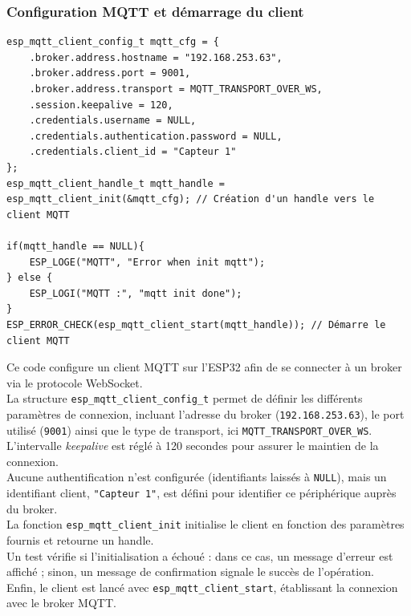 \documentclass[a4paper,11pt]{article}
\begin{document}
      \subsubsection{Configuration MQTT et démarrage du client}
      \begin{lstlisting}[style=C, caption={Event Handler de la pile IP Netif}]
esp_mqtt_client_config_t mqtt_cfg = { 
    .broker.address.hostname = "192.168.253.63",
    .broker.address.port = 9001,
    .broker.address.transport = MQTT_TRANSPORT_OVER_WS,
    .session.keepalive = 120, 
    .credentials.username = NULL,
    .credentials.authentication.password = NULL,
    .credentials.client_id = "Capteur 1"
};
esp_mqtt_client_handle_t mqtt_handle = esp_mqtt_client_init(&mqtt_cfg); // Création d'un handle vers le client MQTT

if(mqtt_handle == NULL){
    ESP_LOGE("MQTT", "Error when init mqtt");
} else {
    ESP_LOGI("MQTT :", "mqtt init done");
}
ESP_ERROR_CHECK(esp_mqtt_client_start(mqtt_handle)); // Démarre le client MQTT

      \end{lstlisting}
      \noindent
      Ce code configure un client MQTT sur l’ESP32 afin de se connecter à un broker via le protocole WebSocket.\\
      La structure \texttt{esp\_mqtt\_client\_config\_t} permet de définir les différents paramètres de connexion, incluant l’adresse du broker (\texttt{192.168.253.63}), le port utilisé (\texttt{9001}) ainsi que le type de transport, ici \texttt{MQTT\_TRANSPORT\_OVER\_WS}.\\
      L’intervalle \textit{keepalive} est réglé à 120 secondes pour assurer le maintien de la connexion.\\
      Aucune authentification n’est configurée (identifiants laissés à \texttt{NULL}), mais un identifiant client, \texttt{"Capteur 1"}, est défini pour identifier ce périphérique auprès du broker.\\
      La fonction \texttt{esp\_mqtt\_client\_init} initialise le client en fonction des paramètres fournis et retourne un handle.\\
      Un test vérifie si l’initialisation a échoué : dans ce cas, un message d’erreur est affiché ; sinon, un message de confirmation signale le succès de l’opération.\\
      Enfin, le client est lancé avec \texttt{esp\_mqtt\_client\_start}, établissant la connexion avec le broker MQTT.
      \newpage
\end{document}
